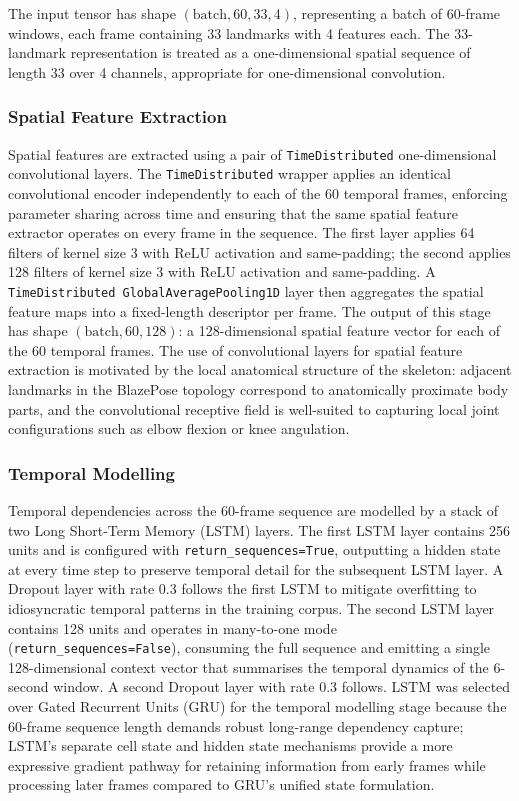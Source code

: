 \documentclass[journal]{IEEEtran}
\begin{document}
The input tensor has shape $(\text{batch}, 60, 33, 4)$, representing
a batch of 60-frame windows, each frame containing 33 landmarks with
4 features each. The 33-landmark representation is treated as a
one-dimensional spatial sequence of length 33 over 4 channels,
appropriate for one-dimensional convolution.

\subsubsection{Spatial Feature Extraction}

Spatial features are extracted using a pair of
\texttt{TimeDistributed} one-dimensional convolutional layers.
The \texttt{TimeDistributed} wrapper applies an identical convolutional
encoder independently to each of the 60 temporal frames, enforcing
parameter sharing across time and ensuring that the same spatial
feature extractor operates on every frame in the sequence. The first
layer applies 64 filters of kernel size 3 with ReLU activation and
same-padding; the second applies 128 filters of kernel size 3 with
ReLU activation and same-padding. A \texttt{TimeDistributed
GlobalAveragePooling1D} layer then aggregates the spatial
feature maps into a fixed-length descriptor per frame. The output
of this stage has shape $(\text{batch}, 60, 128)$: a 128-dimensional
spatial feature vector for each of the 60 temporal frames. The use
of convolutional layers for spatial feature extraction is motivated
by the local anatomical structure of the skeleton: adjacent landmarks
in the BlazePose topology correspond to anatomically proximate body
parts, and the convolutional receptive field is well-suited to
capturing local joint configurations such as elbow flexion or
knee angulation.

\subsubsection{Temporal Modelling}

Temporal dependencies across the 60-frame sequence are modelled by a
stack of two Long Short-Term Memory (LSTM) layers. The first LSTM
layer contains 256 units and is configured with
\texttt{return\_sequences=True}, outputting a hidden state at every
time step to preserve temporal detail for the subsequent LSTM layer.
A Dropout layer with rate 0.3 follows the first LSTM to mitigate
overfitting to idiosyncratic temporal patterns in the training corpus.
The second LSTM layer contains 128 units and operates in
many-to-one mode (\texttt{return\_sequences=False}), consuming the
full sequence and emitting a single 128-dimensional context vector
that summarises the temporal dynamics of the 6-second window.
A second Dropout layer with rate 0.3 follows. LSTM was selected over
Gated Recurrent Units (GRU) for the temporal modelling stage because
the 60-frame sequence length demands robust long-range dependency
capture; LSTM's separate cell state and hidden state mechanisms
provide a more expressive gradient pathway for retaining information
from early frames while processing later frames compared to GRU's
unified state formulation.
\end{document}
